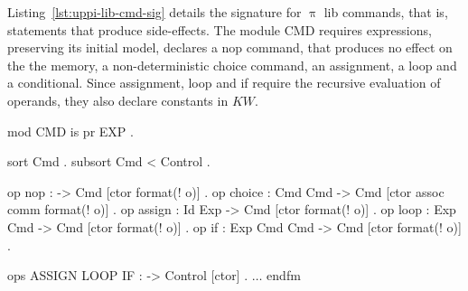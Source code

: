 \documentclass[a4paper,openany]{book}
\begin{document}
Listing~\ref{lst:uppi-lib-cmd-sig} details the signature for $\uppi$ lib commands, that is, statements that produce side-effects. The module CMD requires expressions, preserving its initial model, declares a nop command, that produces no effect on the the memory, a non-deterministic choice command, an assignment, a loop and a conditional. Since assignment, loop and if require the recursive evaluation of operands, they also declare constants in $\mathit{KW}$.  
\begin{maude}[caption=Signature for $\uppi$ lib commands in Maude,label=lst:uppi-lib-cmd-sig]
mod CMD is
    pr EXP .

    sort Cmd .
    subsort Cmd < Control .

    op nop : -> Cmd [ctor format(! o)] .
    op choice : Cmd Cmd -> Cmd [ctor assoc comm format(! o)] .
    op assign : Id Exp -> Cmd [ctor format(! o)] .
    op loop : Exp Cmd -> Cmd [ctor format(! o)] .
    op if : Exp Cmd Cmd -> Cmd [ctor format(! o)] .

    ops ASSIGN LOOP IF : -> Control [ctor] . 
    $\ldots$
endfm
\end{maude}
\end{document}
